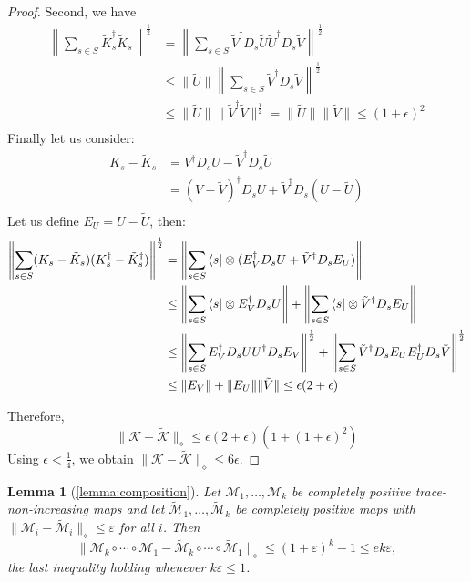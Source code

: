 \documentclass[aps,floatfix,10pt,amssymb,amsfont,amsmath,superscriptaddress,float,nofootinbib,longbibliography,nobalancelastpage,twocolumn]{revtex4-2}
\newtheorem*{lemma*}{Lemma}
\begin{document}
\begin{proof}
Second, we have
\begin{align}
    \left\|\sum_{s\in S}\tilde K_s^{\dagger} \tilde K_s \right\|^{\frac{1}{2}} &= \left\|\sum_{s\in S} \tilde V^{\dagger} D_s \tilde U\tilde U^{\dagger}  D_s \tilde V\right\|^{\frac{1}{2}} \\
     &\leq \|\tilde U\|\left\|\sum_{s\in S} \tilde V^{\dagger} D_s  \tilde V\right\|^{\frac{1}{2}}\\
     &\leq \|\tilde U\| \|\tilde V^{\dagger}  \tilde V\|^{\frac{1}{2}}= \|\tilde U\|\|\tilde V\| \leq (1+\epsilon)^2\\
\end{align}
Finally let us consider:
\begin{align}
    K_s-\tilde K_s &= V^{\dagger}  D_s U-\tilde V^{\dagger}  D_s \tilde U\\
    &=  (V-\tilde V)^{\dagger}  D_s U+\tilde V^{\dagger}  D_s (U-\tilde U)\\
\end{align}
Let us define $E_U = U - \tilde U$, then:
\begin{align}
    \left\|\sum_{s\in S}(K_s - \tilde K_s)(K_s^\dagger - \tilde K_s^\dagger)\right\|^{\frac{1}{2}}&= \left\| \sum_{s \in S}\bra{s} \otimes ( E_V^{\dagger}  D_s U+\tilde V^{\dagger}  D_sE_U)\right\|\\
    &\leq  \left\| \sum_{s \in S} \bra{s} \otimes E_V^{\dagger}  D_s U \right\| + \left\| \sum_{s \in S} \bra{s} \otimes \tilde V^{\dagger}  D_sE_U\right\|\\
    &\leq  \left\| \sum_{s \in S} E_V^{\dagger}  D_s U U^{\dagger} D_s E_V \right\|^{\frac{1}{2}} + \left\| \sum_{s \in S} \tilde V^{\dagger}  D_sE_UE_U^{\dagger} D_s \tilde V\right\|^{\frac{1}{2}}\\
    &\leq \|E_V\| + \|E_U\|\|\tilde V\| \leq \epsilon(2+\epsilon)
\end{align}

Therefore,
\begin{equation}
    \|\mathcal{K} - \tilde{\mathcal{K}}\|_{\diamond} \leq \epsilon(2+\epsilon)(1+(1+\epsilon)^2)
\end{equation}
Using $\epsilon<\frac14$, we obtain $\|\mathcal{K} - \tilde {\mathcal{K}}\|_{\diamond} \leq 6\epsilon$.
\end{proof}
\begin{lemma*}[\ref{lemma:composition}]
Let $\mathcal{M}_1, \ldots, \mathcal{M}_k$ be completely positive trace-non-increasing maps and let $\tilde{\mathcal{M}}_1, \ldots, \tilde{\mathcal{M}}_k$ be completely positive maps with $\|\mathcal{M}_i - \tilde{\mathcal{M}}_i\|_{\diamond} \leq \varepsilon$ for all $i$. Then
\begin{equation}
    \|\mathcal{M}_k \circ \cdots \circ \mathcal{M}_1 - \tilde{\mathcal{M}}_k \circ \cdots \circ \tilde{\mathcal{M}}_1\|_{\diamond} \leq (1+\varepsilon)^k - 1 \leq e k \varepsilon,
\end{equation}
the last inequality holding whenever $k\varepsilon \leq 1$.
\end{lemma*}
\end{document}
